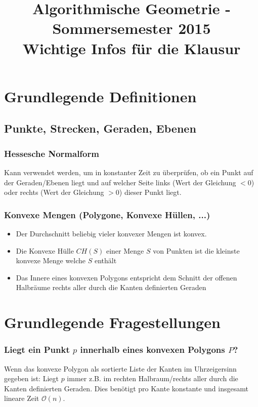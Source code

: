 \documentclass[a4paper]{article}
\begin{document}
\title{Algorithmische Geometrie - Sommersemester 2015\\
       Wichtige Infos für die Klausur}
\date{}
\maketitle

\section*{Grundlegende Definitionen}

\subsection*{Punkte, Strecken, Geraden, Ebenen}
\subsubsection*{Hessesche Normalform}
Kann verwendet werden, um in konstanter Zeit zu überprüfen, ob ein Punkt auf der Geraden/Ebenen
liegt und auf welcher Seite links (Wert der Gleichung $<0$) oder
rechts (Wert der Gleichung $>0$) dieser Punkt liegt.

\subsubsection*{Konvexe Mengen (Polygone, Konvexe Hüllen, ...)}
\begin{itemize}
	\item Der Durchschnitt beliebig vieler konvexer Mengen ist konvex.
	\item Die Konvexe Hülle $CH(S)$ einer Menge $S$ von Punkten ist die kleinste konvexe Menge
	welche $S$ enthält
	\item Das Innere eines konvexen Polygons entspricht dem Schnitt der offenen Halbräume rechts
	aller durch die Kanten definierten Geraden
\end{itemize}

\section*{Grundlegende Fragestellungen}
\subsubsection*{Liegt ein Punkt $p$ innerhalb eines konvexen Polygons $P$?}
Wenn das konvexe Polygon als sortierte Liste der Kanten im Uhrzeigersinn gegeben ist:
Liegt $p$ immer z.B. im rechten Halbraum/rechts aller durch die Kanten definierten Geraden.
Dies benötigt pro Kante konstante und insgesamt lineare Zeit $\mathcal{O}(n)$.
\end{document}
